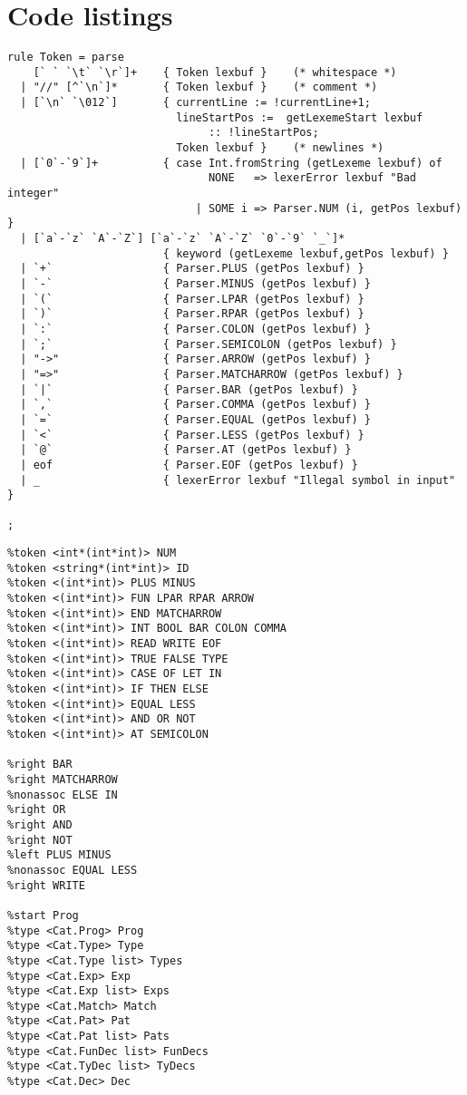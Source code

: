 \chapter{Code listings}\label{app:listings}

\begin{lstlisting}
rule Token = parse
    [` ` `\t` `\r`]+    { Token lexbuf }    (* whitespace *)
  | "//" [^`\n`]*	    { Token lexbuf }    (* comment *)
  | [`\n` `\012`]       { currentLine := !currentLine+1;
                          lineStartPos :=  getLexemeStart lexbuf
			                   :: !lineStartPos;
                          Token lexbuf }    (* newlines *)
  | [`0`-`9`]+          { case Int.fromString (getLexeme lexbuf) of
                               NONE   => lexerError lexbuf "Bad integer"
                             | SOME i => Parser.NUM (i, getPos lexbuf) }
  | [`a`-`z` `A`-`Z`] [`a`-`z` `A`-`Z` `0`-`9` `_`]*
                        { keyword (getLexeme lexbuf,getPos lexbuf) }
  | `+`                 { Parser.PLUS (getPos lexbuf) }
  | `-`                 { Parser.MINUS (getPos lexbuf) }
  | `(`                 { Parser.LPAR (getPos lexbuf) }
  | `)`                 { Parser.RPAR (getPos lexbuf) }
  | `:`                 { Parser.COLON (getPos lexbuf) }
  | `;`                 { Parser.SEMICOLON (getPos lexbuf) }
  | "->"                { Parser.ARROW (getPos lexbuf) }
  | "=>"                { Parser.MATCHARROW (getPos lexbuf) }
  | `|`                 { Parser.BAR (getPos lexbuf) }
  | `,`                 { Parser.COMMA (getPos lexbuf) }
  | `=`                 { Parser.EQUAL (getPos lexbuf) }
  | `<`                 { Parser.LESS (getPos lexbuf) }
  | `@`                 { Parser.AT (getPos lexbuf) }
  | eof                 { Parser.EOF (getPos lexbuf) }
  | _                   { lexerError lexbuf "Illegal symbol in input" }

;
\end{lstlisting}\label{lst:lex_tokens}

\begin{lstlisting}
%token <int*(int*int)> NUM
%token <string*(int*int)> ID
%token <(int*int)> PLUS MINUS
%token <(int*int)> FUN LPAR RPAR ARROW
%token <(int*int)> END MATCHARROW
%token <(int*int)> INT BOOL BAR COLON COMMA
%token <(int*int)> READ WRITE EOF
%token <(int*int)> TRUE FALSE TYPE
%token <(int*int)> CASE OF LET IN
%token <(int*int)> IF THEN ELSE
%token <(int*int)> EQUAL LESS
%token <(int*int)> AND OR NOT
%token <(int*int)> AT SEMICOLON

%right BAR
%right MATCHARROW
%nonassoc ELSE IN
%right OR
%right AND
%right NOT
%left PLUS MINUS
%nonassoc EQUAL LESS
%right WRITE

%start Prog
%type <Cat.Prog> Prog
%type <Cat.Type> Type
%type <Cat.Type list> Types
%type <Cat.Exp> Exp
%type <Cat.Exp list> Exps
%type <Cat.Match> Match
%type <Cat.Pat> Pat
%type <Cat.Pat list> Pats
%type <Cat.FunDec list> FunDecs
%type <Cat.TyDec list> TyDecs
%type <Cat.Dec> Dec
\end{lstlisting}\label{lst:parse_pre}

